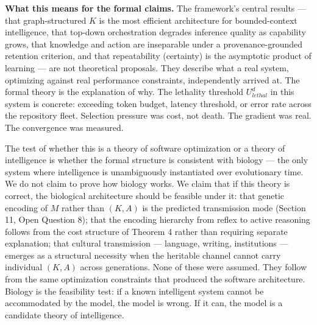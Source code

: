 \documentclass[
]{article}
\begin{document}
\textbf{What this means for the formal claims.} The framework's central
results --- that graph-structured \(K\) is the most efficient
architecture for bounded-context intelligence, that top-down
orchestration degrades inference quality as capability grows, that
knowledge and action are inseparable under a provenance-grounded
retention criterion, and that repeatability (certainty) is the
asymptotic product of learning --- are not theoretical proposals. They
describe what a real system, optimizing against real performance
constraints, independently arrived at. The formal theory is the
explanation of why. The lethality threshold \(U_{lethal}^d\) in this
system is concrete: exceeding token budget, latency threshold, or error
rate across the repository fleet. Selection pressure was cost, not
death. The gradient was real. The convergence was measured.

The test of whether this is a theory of software optimization or a
theory of intelligence is whether the formal structure is consistent
with biology --- the only system where intelligence is unambiguously
instantiated over evolutionary time. We do not claim to prove how
biology works. We claim that if this theory is correct, the biological
architecture should be feasible under it: that genetic encoding of \(M\)
rather than \((K, A)\) is the predicted transmission mode (Section 11,
Open Question 8); that the encoding hierarchy from reflex to active
reasoning follows from the cost structure of Theorem 4 rather than
requiring separate explanation; that cultural transmission --- language,
writing, institutions --- emerges as a structural necessity when the
heritable channel cannot carry individual \((K, A)\) across generations.
None of these were assumed. They follow from the same
optimization constraints that produced the software architecture.
Biology is the feasibility test: if a known intelligent system cannot be
accommodated by the model, the model is wrong. If it can, the model is a
candidate theory of intelligence.
\end{document}
